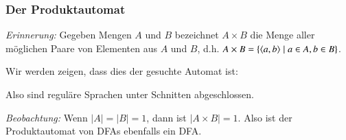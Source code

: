 \documentclass[onlymath]{beamer}
\begin{document}
\begin{frame}\frametitle{Der Produktautomat}

\emph{Erinnerung:} Gegeben Mengen $A$ und $B$ bezeichnet $A\times B$ die Menge aller möglichen Paare von Elementen aus $A$ und $B$, d.h. $A\times B=\{\langle{a,b}\rangle\mid a\in A, b\in B\}$.
\medskip

\pause

Wir werden zeigen, dass dies der gesuchte Automat ist:


Also sind reguläre Sprachen unter Schnitten abgeschlossen.
\bigskip

\emph{Beobachtung:} Wenn $|A|=|B|=1$, dann ist $|A\times B|=1$. Also ist der Produktautomat von DFAs ebenfalls ein DFA.

\end{frame}
\end{document}

